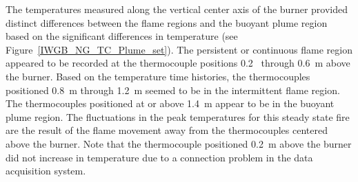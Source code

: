 \documentclass[twoside]{uocthesis}
\begin{document}
{The temperatures measured along the vertical center axis of the burner provided distinct differences between the flame regions and the buoyant plume region based on the significant differences in temperature (see Figure~\ref{IWGB_NG_TC_Plume_set}).  The persistent or continuous flame region appeared to be recorded at the thermocouple positions 0.2~ through 0.6~m above the burner.  Based on the temperature time histories, the thermocouples positioned 0.8~m through 1.2~m seemed to be in the intermittent flame region.  The thermocouples positioned at or above 1.4~m appear to be in the buoyant plume region.  The fluctuations in the peak temperatures for this steady state fire are the result of the flame movement away from the thermocouples centered above the burner.  Note that the thermocouple positioned 0.2~m above the burner did not increase in temperature due to a connection problem in the data acquisition system.            

}
\end{document}
